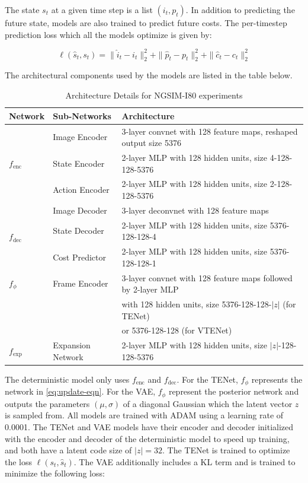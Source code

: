 \documentclass{article}
\begin{document}
\begin{appendices}
  The state $s_t$ at a given time step is a list $(i_t, p_t)$.
  In addition to predicting the future state, models are also trained to predict future costs.
  The per-timestep prediction loss which all the models optimize is given by:

  \begin{equation}
    \ell(\hat{s}_t, s_t) = \|\hat{i}_t - i_t \|_2^2 + \| \hat{p}_t - p_t \|_2^2 + \| \hat{c}_t - c_t \|_2^2
  \end{equation}

  The architectural components used by the models are listed in the table below.

  \begin{table}[h]
    \caption{Architecture Details for NGSIM-I80 experiments}
    \label{sample-table}
    \centering
    \begin{tabular}{lll}
      \toprule
      Network & Sub-Networks     & Architecture    \\
      \midrule
      \multirow{3}{*}{$f_\text{enc}$} & Image Encoder & 3-layer convnet with 128 feature maps, reshaped output size 5376 \\
      & State Encoder & 2-layer MLP with 128 hidden units, size 4-128-128-5376 \\
      & Action Encoder & 2-layer MLP with 128 hidden units, size 2-128-128-5376  \\
      \hline
      \multirow{3}{*}{$f_\text{dec}$} & Image Decoder & 3-layer deconvnet with 128 feature maps \\
      & State Decoder & 2-layer MLP with 128 hidden units, size 5376-128-128-4 \\
      & Cost Predictor & 2-layer MLP with 128 hidden units, size 5376-128-128-1 \\
      \hline
      $f_\phi$ & Frame Encoder & 3-layer convnet with 128 feature maps followed by 2-layer MLP \\ & & with 128 hidden units, size 5376-128-128-$|z|$ (for TENet) \\
      &               & or 5376-128-128 (for VTENet) \\
      \hline
      $f_\text{exp}$ & Expansion Network & 2-layer MLP with 128 hidden units, size $|z|$-128-128-5376\\
      \hline
      \bottomrule
    \end{tabular}
  \end{table}

  The deterministic model only uses $f_\text{enc}$ and $f_\text{dec}$.
  For the TENet, $f_\phi$ represents the network in \cref{eq:update-eqn}.
  For the VAE, $f_\phi$ represent the posterior network and outputs the parameters $(\mu, \sigma)$ of a diagonal Gaussian which the latent vector $z$ is sampled from.
  All models are trained with ADAM \citep{ADAM} using a learning rate of 0.0001.
  The TENet and VAE models have their encoder and decoder initialized with the encoder and decoder of the deterministic model to speed up training, and both have a latent code size of $|z|=32$.
  The TENet is trained to optimize the loss $\ell(s_t, \hat{s}_t)$.
  The VAE additionally includes a KL term and is trained to minimize the following loss:


\end{appendices}
\end{document}
